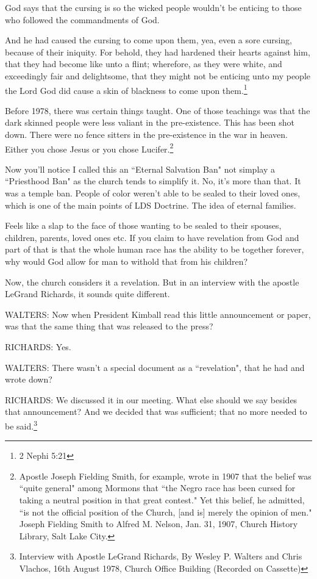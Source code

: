 \documentclass{article}
\begin{document}
God says that the cursing is so the wicked people wouldn't be enticing to those
who followed the commandments of God.

\begin{displayquote}
And he had caused the cursing to come upon them, yea, even a sore cursing, 
because of their iniquity. For behold, they had hardened their hearts against 
him, that they had become like unto a flint; wherefore, as they were white, 
and exceedingly fair and delightsome, that they might not be enticing unto my 
people the Lord God did cause a skin of blackness to come upon 
them.\footnote{2 Nephi 5:21}
\end{displayquote}

Before 1978, there was certain things taught. One of those teachings was that 
the dark skinned people were less valiant in the pre-existence. This has been
shot down. There were no fence sitters in the pre-existence in the war in 
heaven. Either you chose Jesus or you chose Lucifer.\footnote{Apostle Joseph 
Fielding Smith, for example, wrote in 1907 that the belief was ``quite general" 
among Mormons that ``the Negro race has been cursed for taking a neutral 
position in that great contest." Yet this belief, he admitted, ``is not the 
official position of the Church, [and is] merely the opinion of men." 
Joseph Fielding Smith to Alfred M. Nelson, Jan. 31, 1907, 
Church History Library, Salt Lake City.}

Now you'll notice I called this an ``Eternal Salvation Ban" not simplay a 
``Priesthood Ban" as the church tends to simplify it. No, it's more than that.
It was a temple ban. People of color weren't able to be sealed to their loved
ones, which is one of the main points of LDS Doctrine. The idea of eternal
families.

Feels like a slap to the face of those wanting to be sealed to their spouses,
children, parents, loved ones etc. If you claim to have revelation from God and
part of that is that the whole human race has the ability to be together 
forever, why would God allow for man to withold that from his children?

Now, the church considers it a revelation. But in an interview with the apostle
LeGrand Richards, it sounds quite different.

\begin{displayquote}
WALTERS: Now when President Kimball read this little announcement or paper, 
was that the same thing that was released to the press?

RICHARDS: Yes.

WALTERS: There wasn't a special document as a ``revelation", that he had and 
wrote down?

RICHARDS: We discussed it in our meeting. What else should we say besides 
that announcement? And we decided that was sufficient; that no more 
needed to be said.\footnote{Interview with Apostle LeGrand Richards,
By Wesley P. Walters and Chris Vlachos, 16th August 1978, Church Office Building
(Recorded on Cassette)}
\end{displayquote}
\end{document}
